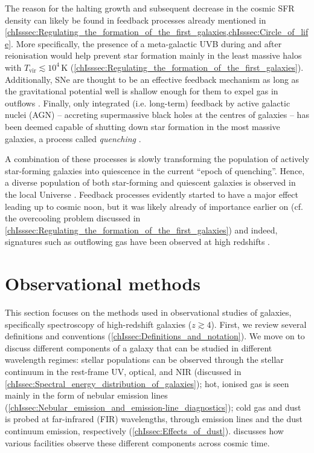 The reason for the halting growth and subsequent decrease in the cosmic SFR density can likely be found in feedback processes already mentioned in \cref{chIsssec:Regulating_the_formation_of_the_first_galaxies,chIsssec:Circle_of_life}. More specifically, the presence of a meta-galactic UVB during and after reionisation \citep{2012ApJ...746..125H} would help prevent star formation mainly in the least massive halos with $T_\text{vir} \lesssim 10^4 \, \mathrm{K}$ (\cref{chIsssec:Regulating_the_formation_of_the_first_galaxies}). Additionally, SNe are thought to be an effective feedback mechanism as long as the gravitational potential well is shallow enough for them to expel gas in outflows \citep{2015MNRAS.446..521S}. Finally, only integrated (i.e. long-term) feedback by active galactic nuclei (AGN) -- accreting supermassive black holes at the centres of galaxies -- has been deemed capable of shutting down star formation in the most massive galaxies, a process called \textit{quenching} \citep[e.g.][]{2022MNRAS.512.1052P}.

A combination of these processes is slowly transforming the population of actively star-forming galaxies into quiescence in the current ``epoch of quenching''. Hence, a diverse population of both star-forming and quiescent galaxies is observed in the local Universe \citep{2010ApJ...721..193P}. Feedback processes evidently started to have a major effect leading up to cosmic noon, but it was likely already of importance earlier on (cf. the overcooling problem discussed in \cref{chIsssec:Regulating_the_formation_of_the_first_galaxies}) and indeed, signatures such as outflowing gas have been observed at high redshifts \citep[e.g.][]{2022ApJ...934...64A}.

\section{Observational methods}
\label{chIsec:Observational_methods}

This section focuses on the methods used in observational studies of galaxies, specifically spectroscopy of high-redshift galaxies ($z \gtrsim 4$). First, we review several definitions and conventions (\cref{chIssec:Definitions_and_notation}). We move on to discuss different components of a galaxy that can be studied in different wavelength regimes: stellar populations can be observed through the stellar continuum in the rest-frame UV, optical, and NIR (discussed in \cref{chIssec:Spectral_energy_distribution_of_galaxies}); hot, ionised gas is seen mainly in the form of nebular emission lines (\cref{chIssec:Nebular_emission_and_emission-line_diagnostics}); cold gas and dust is probed at far-infrared (FIR) wavelengths, through emission lines and the dust continuum emission, respectively (\cref{chIssec:Effects_of_dust}).  discusses how various facilities observe these different components across cosmic time.

